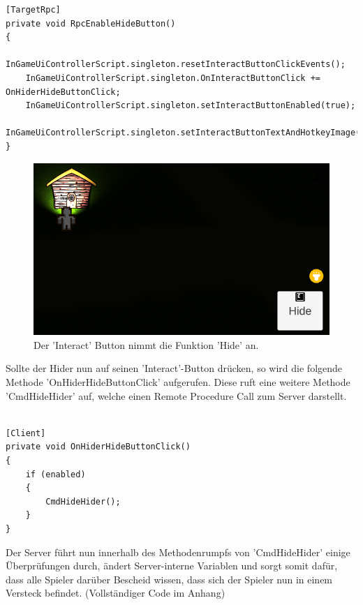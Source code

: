 \begin{lstlisting}[caption= HiderScript.cs Subscribe to InGameUiControllerScript Event]
[TargetRpc]
private void RpcEnableHideButton()
{
	InGameUiControllerScript.singleton.resetInteractButtonClickEvents();
	InGameUiControllerScript.singleton.OnInteractButtonClick += OnHiderHideButtonClick;
	InGameUiControllerScript.singleton.setInteractButtonEnabled(true);
	InGameUiControllerScript.singleton.setInteractButtonTextAndHotkeyImage('Hide');
}
\end{lstlisting}

\begin{figure}[H]
	\centering
	\includegraphics[width=120mm]{images/prototyp_hider_hide_button.png}
	\caption[Hider Hide Button]{Der 'Interact' Button nimmt die Funktion 'Hide' an.}
	\label{pic:prototyp_hider_hide_button}
\end{figure}

Sollte der Hider nun auf seinen 'Interact'-Button drücken, so wird die folgende Methode 'OnHiderHideButtonClick' aufgerufen. Diese ruft eine weitere Methode 'CmdHideHider' auf, welche einen Remote Procedure Call\cite{.05.02.2022} zum Server darstellt.

\begin{lstlisting}[caption= HiderScript.csOnHiderHideButtonClick() Method]

[Client]
private void OnHiderHideButtonClick()
{
	if (enabled)
	{
		CmdHideHider();
	}
}

\end{lstlisting}

Der Server führt nun innerhalb des Methodenrumpfs von 'CmdHideHider' einige Überprüfungen durch, ändert Server-interne Variablen und sorgt somit dafür, dass alle Spieler darüber Bescheid wissen, dass sich der Spieler nun in einem Versteck befindet. (Vollständiger Code im Anhang)

